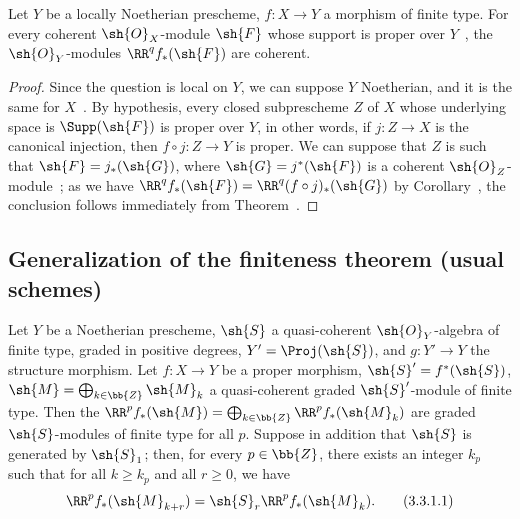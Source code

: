 \begin{corollary}[3.2.4]
\label{III.3.2.4}
Let $Y$ be a locally Noetherian prescheme, $f:X\to Y$ a morphism of finite type.
For every coherent $\sh{O}_X$-module $\sh{F}$ whose support is proper over $Y$~, the $\sh{O}_Y$-modules $\RR^q f_*(\sh{F})$ are coherent.
\end{corollary}

\begin{proof}
Since the question is local on $Y$, we can suppose $Y$ Noetherian, and it is the same for $X$~.
By hypothesis, every closed subprescheme $Z$ of $X$ whose underlying space is $\Supp(\sh{F})$ is proper over $Y$, in other words, if $j:Z\to X$ is the canonical injection, then $f\circ j:Z\to Y$ is proper.
We can suppose that $Z$ is such that $\sh{F}=j_*(\sh{G})$, where $\sh{G}=j^*(\sh{F})$ is a coherent $\sh{O}_Z$-module~; as we have $\RR^q f_*(\sh{F})=\RR^q(f\circ j)_*(\sh{G})$ by Corollary~, the conclusion follows immediately from Theorem~.
\end{proof}

\subsection{Generalization of the finiteness theorem (usual schemes)}
\label{subsection:III.3.3}

\begin{proposition}[3.3.1]
\label{III.3.3.1}
Let $Y$ be a Noetherian prescheme, $\sh{S}$ a quasi-coherent $\sh{O}_Y$-algebra of finite type, graded in positive degrees, $Y'=\Proj(\sh{S})$, and $g:Y'\to Y$ the structure morphism.
Let $f:X\to Y$ be a proper morphism, $\sh{S}'=f^*(\sh{S})$, $\sh{M}=\bigoplus_{k\in\bb{Z}}\sh{M}_k$ a quasi-coherent graded $\sh{S}'$-module of finite type.
Then the $\RR^p f_*(\sh{M})=\bigoplus_{k\in\bb{Z}}\RR^p f_*(\sh{M}_k)$ are graded $\sh{S}$-modules of finite type for all $p$.
Suppose in addition that $\sh{S}$ is generated by $\sh{S}_1$; then, for every $p\in\bb{Z}$, there exists an integer $k_p$ such that for all $k\geq k_p$ and all $r\geq 0$, we have
\[
\label{III.3.3.1.1}
  \RR^p f_*(\sh{M}_{k+r})=\sh{S}_r\RR^p f_*(\sh{M}_k).
  \tag{3.3.1.1}
\] 
\end{proposition}

